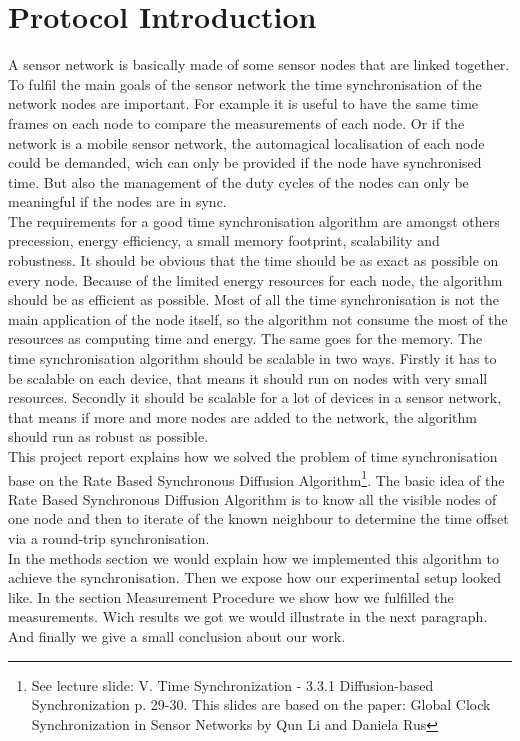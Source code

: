 \documentclass{llncs}
\begin{document}
\section{Protocol Introduction}
A sensor network is basically made of some sensor nodes that are linked together. To fulfil the main goals of the sensor network the time synchronisation of the network nodes are important.  For example it is useful to have the same time frames on each node to compare the measurements of each node. Or if the network is a mobile sensor network, the automagical localisation of each node could be demanded, wich can only be provided if the node have synchronised time. But also the management of the duty cycles of the nodes can only be meaningful if the nodes are in sync.\\
The requirements for a good time synchronisation algorithm are amongst others precession, energy efficiency, a small memory footprint, scalability and robustness. It should be obvious that the time should be as exact as possible on every node. Because of the limited energy resources for each node, the algorithm should be as efficient as possible. Most of all the time synchronisation is not the main application of the node itself, so the algorithm not consume the most of the resources as computing time and energy. The same goes for the memory. The time synchronisation algorithm should be scalable in two ways. Firstly it has to be scalable on each device, that means it should run on nodes with very small resources. Secondly it should be scalable for a lot of devices in a sensor network, that means if more and more nodes are added to the network, the algorithm should run as robust as possible.\\
\noindent This project report explains how we solved the problem of time synchronisation base on the Rate Based Synchronous Diffusion Algorithm\footnote{See lecture slide: V. Time Synchronization - 3.3.1 Diffusion-based Synchronization p. 29-30. This slides are based on the paper: Global Clock Synchronization
in Sensor Networks by Qun Li and  Daniela Rus\cite{LiRus2006}}. The basic idea of the Rate Based Synchronous Diffusion Algorithm is to know all the visible nodes of one node and then to iterate of the known neighbour to determine the time offset via a round-trip synchronisation.\\
In the methods section we would explain how we implemented this algorithm to achieve the synchronisation. Then we expose how our experimental setup looked like. In the section Measurement Procedure we show how we fulfilled the measurements. Wich results we got we would illustrate in the next paragraph. And finally we give a small conclusion about our work. 
\end{document}
